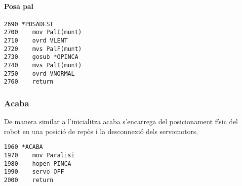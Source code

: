 \paragraph{Posa pal}
\begin{verbatim}
2690 *POSADEST
2700    mov PalI(munt)
2710    ovrd VLENT
2720    mvs PalF(munt)
2730    gosub *OPINCA
2740    mvs PalI(munt)
2750    ovrd VNORMAL
2760 	return
\end{verbatim}

\subsubsection{Acaba}
De manera similar a l'inicialitza acaba s'encarrega del posicionament
físic del robot en una posició de repòs i la desconnexió dels servomotors.

\begin{verbatim}
1960 *ACABA
1970    mov Paralisi
1980    hopen PINCA
1990    servo OFF
2000    return
\end{verbatim}

